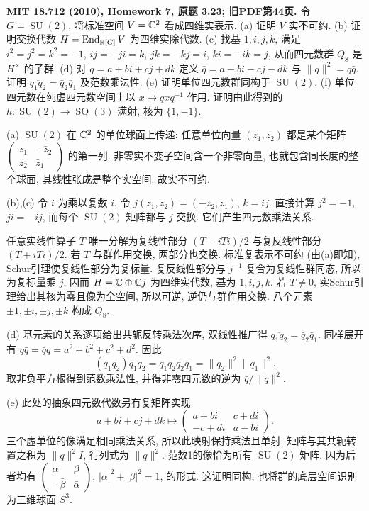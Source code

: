\begin{exercise}\label{hw:3.23}
\textbf{MIT 18.712 (2010), Homework 7, 原题 3.23; 旧PDF第44页.}
令 $G=\operatorname{SU}(2)$, 将标准空间 $V=\mathbb C^2$ 看成四维实表示.
(a) 证明 $V$ 实不可约.
(b) 证明交换代数 $H=\operatorname{End}_{\mathbb R[G]}V$ 为四维实除代数.
(c) 找基 $1,i,j,k$, 满足 $i^2=j^2=k^2=-1$, $ij=-ji=k$, $jk=-kj=i$, $ki=-ik=j$, 从而四元数群 $Q_8$ 是 $H^\times$ 的子群.
(d) 对 $q=a+bi+cj+dk$ 定义 $\bar q=a-bi-cj-dk$ 与 $\|q\|^2=q\bar q$. 证明 $\overline{q_1q_2}=\bar q_2\bar q_1$ 及范数乘法性.
(e) 证明单位四元数群同构于 $\operatorname{SU}(2)$.
(f) 单位四元数在纯虚四元数空间上以 $x\mapsto qxq^{-1}$ 作用. 证明由此得到的 $h:\operatorname{SU}(2)\to\operatorname{SO}(3)$ 满射, 核为 $\{1,-1\}$.
\end{exercise}
\begin{solution}
(a) $\operatorname{SU}(2)$ 在 $\mathbb C^2$ 的单位球面上传递: 任意单位向量 $(z_1,z_2)$ 都是某个矩阵 $\begin{pmatrix}z_1&-\bar z_2\\z_2&\bar z_1\end{pmatrix}$ 的第一列. 非零实不变子空间含一个非零向量, 也就包含同长度的整个球面, 其线性张成是整个实空间. 故实不可约.

(b),(c) 令 $i$ 为乘以复数 $i$, 令 $j(z_1,z_2)=(-\bar z_2,\bar z_1)$, $k=ij$. 直接计算 $j^2=-1$, $ji=-ij$, 而每个 $\operatorname{SU}(2)$ 矩阵都与 $j$ 交换. 它们产生四元数乘法关系.

任意实线性算子 $T$ 唯一分解为复线性部分 $(T-iTi)/2$ 与复反线性部分 $(T+iTi)/2$. 若 $T$ 与群作用交换, 两部分也交换. 标准复表示不可约 (由(a)即知), Schur引理使复线性部分为复标量. 复反线性部分与 $j^{-1}$ 复合为复线性群同态, 所以为复标量乘 $j$. 因而 $H=\mathbb C\oplus\mathbb C j$ 为四维实代数, 基为 $1,i,j,k$. 若 $T\ne0$, 实Schur引理给出其核为零且像为全空间, 所以可逆, 逆仍与群作用交换. 八个元素 $\pm1,\pm i,\pm j,\pm k$ 构成 $Q_8$.

(d) 基元素的关系逐项给出共轭反转乘法次序, 双线性推广得 $\overline{q_1q_2}=\bar q_2\bar q_1$. 同样展开有 $q\bar q=\bar qq=a^2+b^2+c^2+d^2$. 因此
\[
 (q_1q_2)\overline{q_1q_2}
 =q_1q_2\bar q_2\bar q_1=\|q_2\|^2\|q_1\|^2.
\]
取非负平方根得到范数乘法性, 并得非零四元数的逆为 $\bar q/\|q\|^2$.

(e) 此处的抽象四元数代数另有复矩阵实现
\[
 a+bi+cj+dk\longmapsto
 \begin{pmatrix}a+bi&c+di\\-c+di&a-bi\end{pmatrix}.
\]
三个虚单位的像满足相同乘法关系, 所以此映射保持乘法且单射. 矩阵与其共轭转置之积为 $\|q\|^2I$, 行列式为 $\|q\|^2$. 范数1的像恰为所有 $\operatorname{SU}(2)$ 矩阵, 因为后者均有 $\begin{pmatrix}\alpha&\beta\\-\bar\beta&\bar\alpha\end{pmatrix}$, $|\alpha|^2+|\beta|^2=1$, 的形式. 这证明同构, 也将群的底层空间识别为三维球面 $S^3$.


\end{solution}
